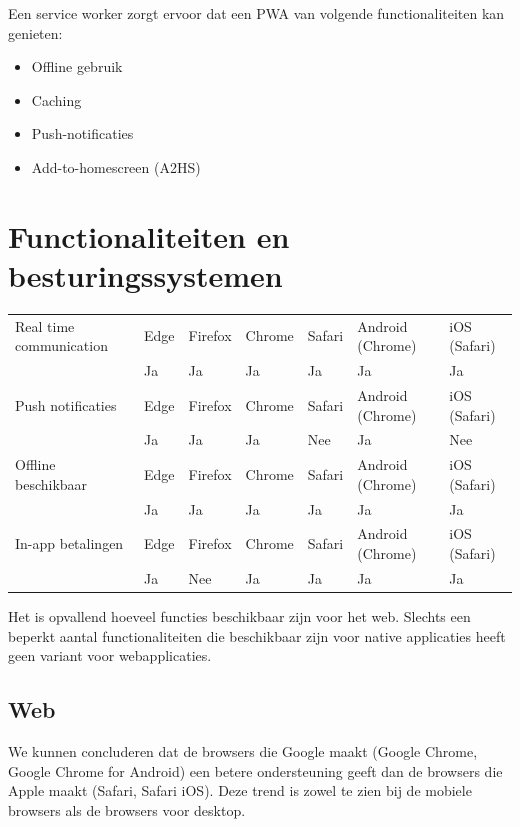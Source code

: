 \documentclass[a0,portrait]{a0poster}
\begin{document}
\begin{multicols}{2}
		Een service worker zorgt ervoor dat een PWA van volgende functionaliteiten kan genieten:
		\begin{itemize}
		   	\item Offline gebruik
		   	\item Caching
		   	\item Push-notificaties
		   	\item Add-to-homescreen (A2HS)
		\end{itemize}

\color{Black}
\color{HoGentAccent1} 
\section*{Functionaliteiten en besturingssystemen}
\color{black}

	\begin{tabular}{lllllll}
		Real time communication &	Edge & Firefox & Chrome & Safari & Android (Chrome) & iOS (Safari) \\
		&Ja   & Ja      & Ja     & Ja     & Ja              & Ja \\       
		Push notificaties&	Edge & Firefox & Chrome & Safari & Android (Chrome) & iOS (Safari) \\
		&Ja   & Ja      & Ja     & Nee     & Ja              & Nee     \\
		Offline beschikbaar &	Edge & Firefox & Chrome & Safari & Android (Chrome) & iOS (Safari) \\
		&Ja   & Ja      & Ja     & Ja     & Ja              & Ja     \\
		In-app betalingen &	Edge & Firefox & Chrome & Safari & Android (Chrome) & iOS (Safari) \\
		&Ja   & Nee      & Ja     & Ja     & Ja              & Ja     \\
	\end{tabular}	
	
	Het is opvallend hoeveel functies beschikbaar zijn voor het web. Slechts een beperkt aantal functionaliteiten die beschikbaar zijn voor native applicaties heeft geen variant voor webapplicaties.

	\subsection{Web}
		We kunnen concluderen dat de browsers die Google maakt (Google Chrome, Google Chrome for Android) een betere ondersteuning geeft dan de browsers die Apple maakt (Safari, Safari iOS). Deze trend is zowel te zien bij de mobiele browsers als de browsers voor desktop.
	

\end{multicols}
\end{document}
